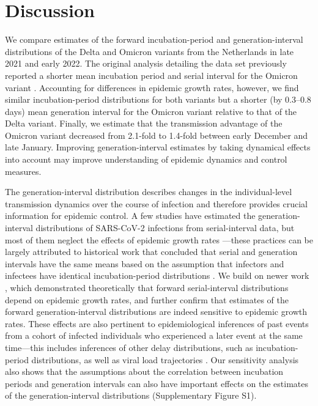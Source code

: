 \documentclass[12pt]{article}
\begin{document}
\section{Discussion}

We compare estimates of the forward incubation-period and generation-interval distributions of the Delta and Omicron variants from the Netherlands in late 2021 and early 2022.
The original analysis detailing the data set previously reported a shorter mean incubation period and serial interval for the Omicron variant \citep{backer2021omicron}.
Accounting for differences in epidemic growth rates, however, we find similar incubation-period distributions for both variants but a shorter (by 0.3--0.8 days) mean generation interval for the Omicron variant relative to that of the Delta variant.
Finally, we estimate that the transmission advantage of the Omicron variant decreased from 2.1-fold to 1.4-fold between early December and late January.
Improving generation-interval estimates by taking dynamical effects into account may improve understanding of epidemic dynamics and control measures.

The generation-interval distribution describes changes in the individual-level transmission dynamics over the course of infection and therefore provides crucial information for epidemic control.
A few studies have estimated the generation-interval distributions of SARS-CoV-2 infections from serial-interval data, but most of them neglect the effects of epidemic growth rates \citep{ganyani2020estimating,he2020temporal,zhao2021estimating,hart2022generation}---these practices can be largely attributed to historical work that concluded that serial and generation intervals have the same means based on the assumption that infectors and infectees have identical incubation-period distributions \citep{svensson2007note,britton2019estimation,lehtinen2021relationship}.
We build on newer work \citep{park2021forward}, which demonstrated theoretically that forward serial-interval distributions depend on epidemic growth rates, and further confirm that estimates of the forward generation-interval distributions are indeed sensitive to epidemic growth rates.
These effects are also pertinent to epidemiological inferences of past events from a cohort of infected individuals who experienced a later event at the same time---this includes inferences of other delay distributions, such as incubation-period distributions, as well as viral load trajectories \citep{hay2021estimating}.
Our sensitivity analysis also shows that the assumptions about the correlation between incubation periods and generation intervals can also have important effects on the estimates of the generation-interval distributions (Supplementary Figure S1).
\end{document}
